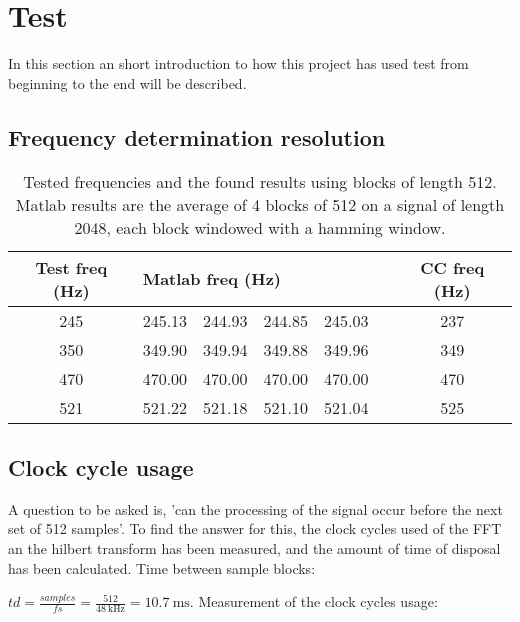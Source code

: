 
\section{Test}
\label{sec:test}
In this section an short introduction to how this project has used test from beginning to the end will be described.
\subsection{Frequency determination resolution}
\begin{table}
	\centering
	\begin{tabular}{c | c c c c c | c}
		\toprule
		Test freq (Hz) & \multicolumn{4}{l}{Matlab freq (Hz)} & & CC freq (Hz) \\
		\midrule
		\num{245} & \num{245.13} & \num{244.93} & \num{244.85} & \num{245.03} && \num{237}\\
		\num{350} & \num{349.90} & \num{349.94} & \num{349.88} & \num{349.96} && \num{349}\\
		\num{470} & \num{470.00} & \num{470.00} & \num{470.00} & \num{470.00} && \num{470} \\
		\num{521} & \num{521.22} & \num{521.18} & \num{521.10} & \num{521.04} && \num{525} \\
		\bottomrule
	\end{tabular}
	\caption{Tested frequencies and the found results using blocks of length \num{512}. Matlab results are the average of 4 blocks of \num{512} on a signal of length \num{2048}, each block windowed with a hamming window.}
	\label{tab:test}
\end{table}

\subsection{Clock cycle usage}
A question to be asked is, 'can the processing of the signal occur before the next set of 512 samples'. To find the answer for this, the clock cycles used of the FFT an the hilbert transform has been measured, and the amount of time of disposal has been calculated.\newline
Time between sample blocks: 

$td = \frac{samples}{fs} = \frac{512}{\SI{48}{\kilo\hertz}} = \SI{10.7}{\milli\second}$. \newline
Measurement of the clock cycles usage: 

